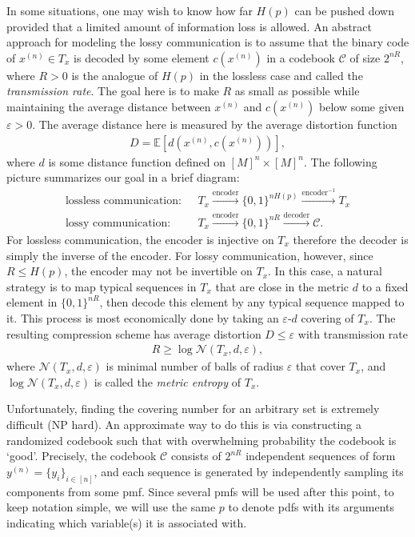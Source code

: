 \documentclass[10pt,a4paper]{amsart}
\numberwithin{equation}{section}
\theoremstyle{plain}
\theoremstyle{definition}
\def\E{{\mathbb E}}
\def\e{{\varepsilon}}
\begin{document}
In some situations, one may wish to know how far $H(p)$ can be pushed down provided that a limited amount of information loss is allowed. An abstract approach for modeling the lossy communication is to assume that the binary code of $x^{(n)}\in T_x$ is decoded by some element $c(x^{(n)})$ in a codebook $\mathcal C$ of size $2^{nR}$, where $R>0$ is the analogue of $H(p)$ in the lossless case and called the \emph{transmission rate}. The goal here is to make $R$ as small as possible while maintaining the average distance between $x^{(n)}$ and $c(x^{(n)})$ below some given $\e>0$. The average distance here is measured by the average distortion function 
\begin{align*}
D = \E[d(x^{(n)}, c(x^{(n)}))],
\end{align*}
where $d$ is some distance function defined on $[M]^n\times [M]^n$. The following picture summarizes our goal in a brief diagram:
\begin{align*}
\text{lossless communication:}\ \ \ &T_x\xrightarrow{\text{encoder}}\{0,1\}^{nH(p)}\xrightarrow{\text{encoder}^{-1}}T_x\\
\text{lossy communication:}\ \ \ &T_x\xrightarrow{\text{encoder}}\{0,1\}^{nR}\xrightarrow{\text{decoder}}\mathcal C.
\end{align*}
For lossless communication, the encoder is injective on $T_x$ therefore the decoder is simply the inverse of the encoder. For lossy communication, however, since $R\leq H(p)$, the encoder may not be invertible on $T_x$. In this case, a natural strategy is to map typical sequences in $T_x$ that are close in the metric $d$ to a fixed element in $\{0,1\}^{nR}$, then decode this element by any typical sequence mapped to it. This process is most economically done by taking an $\e$-$d$ covering of $T_x$. The resulting compression scheme has average distortion $D\leq\e$ with transmission rate \begin{align*}
R \geq \log\mathcal N(T_x, d, \e), 
\end{align*}
where $\mathcal N(T_x, d, \e)$ is minimal number of balls of radius $\e$ that cover $T_x$, and $\log\mathcal N(T_x, d, \e)$ is called the \emph{metric entropy} of $T_x$. 

Unfortunately, finding the covering number for an arbitrary set is extremely difficult (NP hard). An approximate way to do this is via constructing a randomized codebook such that with overwhelming probability the codebook is `good'. Precisely, the codebook $\mathcal C$ consists of $2^{nR}$ independent sequences of form $y^{(n)}=\{y_i\}_{i\in [n]}$, and each sequence is generated by independently sampling its components from some pmf. Since several pmfs will be used after this point, to keep notation simple, we will use the same $p$ to denote pdfs with its arguments indicating which variable(s) it is associated with.  
\end{document}
